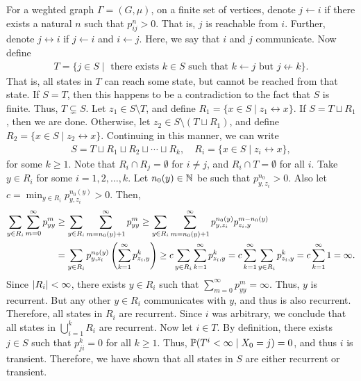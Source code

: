 For a weghted graph $\Gamma = (G,\mu)$, on a finite set of vertices, denote $j \leftarrow i$ if there exists a natural $n$ such that $p_{ij}^{n} > 0$. That is, $j$ is reachable from $i$. Further, denote $j \leftrightarrow i$ if $j \leftarrow i$ and $i \leftarrow j$. Here, we say that $i$ and $j$ communicate. Now define
\begin{align}
    T = \{j \in S \mid \text{ there exists } k \in S \text{ such that } k \leftarrow j \text{ but } j \not\leftarrow k\}.
\end{align}
That is, all states in $T$ can reach some state, but cannot be reached from that state. If $S = T$, then this happens to be a contradiction to the fact that $S$ is finite. Thus, $T \subsetneq S$. Let $z_{1} \in S \setminus T$, and define $R_{1} = \{x \in S \mid z_{1} \leftrightarrow x\}$. If $S = T \sqcup R_{1}$, then we are done. Otherwise, let $z_{2} \in S \setminus (T \sqcup R_{1})$, and define $R_{2} = \{x \in S \mid z_{2} \leftrightarrow x\}$. Continuing in this manner, we can write
\begin{align}
    S = T \sqcup R_{1} \sqcup R_{2} \sqcup \cdots \sqcup R_{k}, \quad R_{i} = \{x \in S \mid z_{i} \leftrightarrow x\},
\end{align}
for some $k \geq 1$. Note that $R_{i} \cap R_{j} = \emptyset$ for $i \neq j$, and $R_{i} \cap T = \emptyset$ for all $i$. Take $y \in R_{i}$ for some $i = 1,2,\ldots,k$. Let $n_{0}(y) \in \mathbb{N}$ be such that $p_{y,z_{i}}^{n_{0}} > 0$. Also let $c = \min_{y \in R_{i}} p_{y,z_{i}}^{n_{0}(y)} > 0$. Then,
\begin{align}
    \sum_{y \in R_{i}} \sum_{m=0}^{\infty} p_{yy}^{m} &\geq \sum_{y \in R_{i}} \sum_{m=n_{0}(y)+1}^{\infty} p_{yy}^{m} \geq \sum_{y \in R_{i}} \sum_{m=n_{0}(y)+1}^{\infty} p_{y,z_{i}}^{n_{0}(y)}p_{z_{i},y}^{m-n_{0}(y)} \notag \\
    &= \sum_{y \in R_{i}} p_{y,z_{i}}^{n_{0}(y)} \left( \sum_{k=1}^{\infty} p_{z_{i},y}^{k} \right) \geq c \sum_{y \in R_{i}} \sum_{k=1}^{\infty} p_{z_{i},y}^{k} = c \sum_{k=1}^{\infty} \sum_{y \in R_{i}} p_{z_{i},y}^{k} = c \sum_{k=1}^{\infty} 1 = \infty.
\end{align}
Since $\left| R_{i} \right| < \infty$, there exists $y \in R_{i}$ such that $\sum_{m=0}^{\infty} p_{yy}^{m} = \infty$. Thus, $y$ is recurrent. But any other $y \in R_{i}$ communicates with $y$, and thus is also recurrent. Therefore, all states in $R_{i}$ are recurrent. Since $i$ was arbitrary, we conclude that all states in $\bigcup_{i=1}^{k} R_{i}$ are recurrent. Now let $i \in T$. By definition, there exists $j \in S$ such that $p_{ji}^{k} = 0$ for all $k \geq 1$. Thus, $\mathbb{P}(T^{i} < \infty \mid X_{0}=j) = 0$, and thus $i$ is transient. Therefore, we have shown that all states in $S$ are either recurrent or transient.
\\

